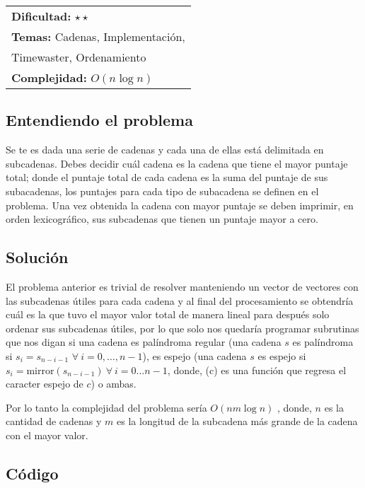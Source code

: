 \hfill
\begin{tabular}{@{}l@{}}
\textbf{Dificultad:} $\star \star$ \\
\textbf{Temas:} Cadenas, Implementación,\\
Timewaster, Ordenamiento \\
\textbf{Complejidad:} $O(n \log n)$
\end{tabular}

\subsection*{Entendiendo el problema}
Se te es dada una serie de cadenas y cada una de ellas está delimitada en subcadenas. Debes decidir cuál cadena es la 
cadena que tiene el mayor puntaje total; donde el puntaje total de 
cada cadena es la suma del puntaje de sus subacadenas, los 
puntajes para cada tipo de subacadena se definen en el problema. Una vez obtenida la cadena con mayor puntaje se deben imprimir, en orden lexicográfico,
sus subcadenas que tienen un puntaje mayor a cero.
\subsection*{Solución}

El problema anterior es trivial de resolver manteniendo un
vector de vectores con las subcadenas útiles para cada cadena
y al final del procesamiento se obtendría cuál es la que tuvo 
el mayor valor total de manera lineal para después solo ordenar sus
subcadenas útiles, por lo que solo nos quedaría programar 
subrutinas que nos digan si una cadena es palíndroma regular (una cadena $s$ es palíndroma si $s_i = s_{n-i-1}$ $\forall\ i = 0, \dots, n-1$), es espejo (una cadena $s$ es espejo si  $s_i = \text{mirror}(s_{n-i-1}) \ \forall\ i = 0 \dots n-1$, donde, (c) es una función que regresa el caracter espejo de $c$) o ambas.

Por lo tanto la complejidad del problema sería $O(n m \log n)$ , donde, $n$ es la cantidad de cadenas y $m$ es la longitud de la subcadena más grande de la cadena con el mayor valor.

\subsection*{Código}

